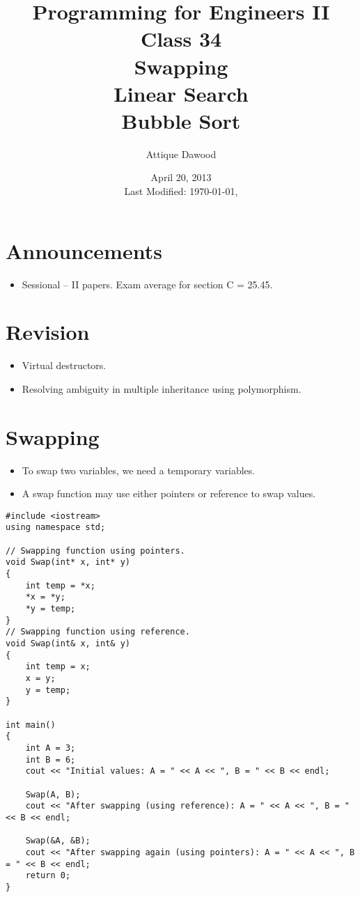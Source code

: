 \documentclass[12pt,a4paper]{article}
\title{\vspace{-2cm}Programming for Engineers II\\Class 34\\Swapping\\Linear Search\\Bubble Sort}
\author{Attique Dawood}
\date{April 20, 2013\\[0.2cm] Last Modified: \today, \currenttime}
\begin{document}
\maketitle
\section{Announcements}
\begin{itemize}
\item Sessional -- II papers. Exam average for section C = 25.45.
\end{itemize}
\section{Revision}
\begin{itemize}
\item Virtual destructors.
\item Resolving ambiguity in multiple inheritance using polymorphism.
\end{itemize}
\section{Swapping}
\begin{itemize}
\item To swap two variables, we need a temporary variables.
\item A swap function may use either pointers or reference to swap values.
\end{itemize}
\begin{lstlisting}[caption={Swapping Functions Using Pointer and Reference},escapechar=$]
#include <iostream>
using namespace std;

// Swapping function using pointers.
void Swap(int* x, int* y)
{
	int temp = *x;
	*x = *y;
	*y = temp;
}
// Swapping function using reference.
void Swap(int& x, int& y)
{
	int temp = x;
	x = y;
	y = temp;
}

int main()
{
	int A = 3;
	int B = 6;
	cout << "Initial values: A = " << A << ", B = " << B << endl;

	Swap(A, B);
	cout << "After swapping (using reference): A = " << A << ", B = " << B << endl;

	Swap(&A, &B);
	cout << "After swapping again (using pointers): A = " << A << ", B = " << B << endl;
	return 0;
}
\end{lstlisting}
\end{document}
